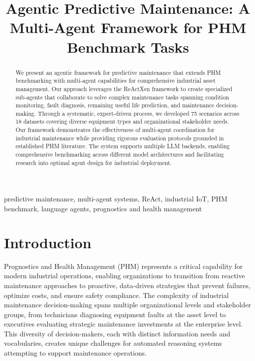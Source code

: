 \documentclass[conference]{IEEEtran}
\begin{document}
\title{Agentic Predictive Maintenance: A Multi-Agent Framework for PHM Benchmark Tasks}

\author{
\and
{}
}

\maketitle

\begin{abstract}
We present an agentic framework for predictive maintenance that extends PHM benchmarking with multi-agent capabilities for comprehensive industrial asset management. Our approach leverages the ReActXen framework to create specialized sub-agents that collaborate to solve complex maintenance tasks spanning condition monitoring, fault diagnosis, remaining useful life prediction, and maintenance decision-making. Through a systematic, expert-driven process, we developed 75 scenarios across 18 datasets covering diverse equipment types and organizational stakeholder needs. Our framework demonstrates the effectiveness of multi-agent coordination for industrial maintenance while providing rigorous evaluation protocols grounded in established PHM literature. The system supports multiple LLM backends, enabling comprehensive benchmarking across different model architectures and facilitating research into optimal agent design for industrial deployment.
\end{abstract}

\begin{IEEEkeywords}
predictive maintenance, multi-agent systems, ReAct, industrial IoT, PHM benchmark, language agents, prognostics and health management
\end{IEEEkeywords}

\section{Introduction}

Prognostics and Health Management (PHM) represents a critical capability for modern industrial operations, enabling organizations to transition from reactive maintenance approaches to proactive, data-driven strategies that prevent failures, optimize costs, and ensure safety compliance. The complexity of industrial maintenance decision-making spans multiple organizational levels and stakeholder groups, from technicians diagnosing equipment faults at the asset level to executives evaluating strategic maintenance investments at the enterprise level. This diversity of decision-makers, each with distinct information needs and vocabularies, creates unique challenges for automated reasoning systems attempting to support maintenance operations.
\end{document}
